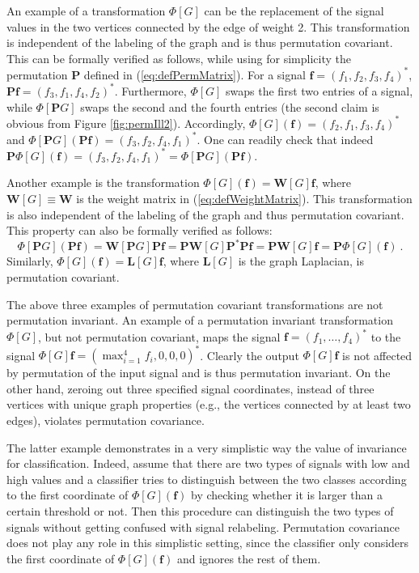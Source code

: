 \documentclass{article}
\def\BL{\boldsymbol{L}}
\def\BP{\boldsymbol{P}}
\def\BW{\boldsymbol{W}}
\def\Bf{\boldsymbol{f}}
\begin{document}
An example of a transformation $\Phi[G]$ can be the replacement of the signal values in the two vertices connected by the edge of weight 2. This transformation is independent of the labeling of the graph and is thus permutation covariant. This can be formally verified as follows, while using for simplicity the permutation $\BP$ defined in (\ref{eq:defPermMatrix}). For a signal $\Bf = (f_1, f_2, f_3, f_4)^*$, $\BP \Bf = (f_3, f_1, f_4, f_2)^*$. Furthermore, $\Phi[G]$ swaps the first two entries of a signal, while $\Phi[\BP G]$ swaps the second and the fourth entries (the second claim is obvious from Figure \ref{fig:permIll2}). Accordingly, $\Phi[G] (\Bf) = (f_2, f_1, f_3, f_4)^*$ and $\Phi[\BP G] (\BP \Bf) = (f_3, f_2, f_4, f_1)^*$. One can readily check that indeed $\BP \Phi[G] (\Bf) = (f_3, f_2, f_4, f_1)^* = \Phi[\BP G] (\BP \Bf)$.

Another example is the transformation $\Phi[G] (\Bf) = \BW[G] \Bf$, where $\BW[G] \equiv \BW$  is the weight matrix in (\ref{eq:defWeightMatrix}). This transformation is also independent of the labeling of the graph and thus permutation covariant. This property can also be formally verified as follows:
\begin{equation}
\Phi[\BP G] (\BP \Bf) = \BW[\BP G] \BP \Bf = \BP \BW[G] \BP^* \BP \Bf = \BP \BW[G] \Bf = \BP \Phi[G](\Bf) ~.
\end{equation}
Similarly, $\Phi[G] (\Bf) = \BL[G] \Bf$, where  $\BL[G]$ is the graph Laplacian, is permutation covariant.

The above three examples of permutation covariant transformations are not permutation invariant. An example of a permutation invariant transformation $\Phi[G]$, but not permutation covariant, maps the signal $\Bf = (f_1, \ldots, f_4)^*$ to the signal $\Phi[G] \Bf = (\max_{i=1}^4 f_i, 0,0,0)^*$. Clearly the output $\Phi[G] \Bf$ is not affected by permutation of the input signal and is thus permutation invariant. On the other hand, zeroing out three specified signal coordinates, instead of three vertices with unique graph properties (e.g., the vertices connected by at least two edges), violates permutation covariance. 

The latter example demonstrates in a very simplistic way the value of invariance for classification. Indeed, assume that there are two types of signals with low and high values and a classifier tries to distinguish between the two classes according to the first coordinate of $\Phi[G] (\Bf)$ by checking whether it is larger than a certain threshold or not. Then this procedure can distinguish the two types of signals without getting confused with signal relabeling. Permutation covariance does not play any role in this simplistic setting, since the classifier only considers the first coordinate of $\Phi[G] (\Bf)$ and ignores the rest of them. 
\end{document}
